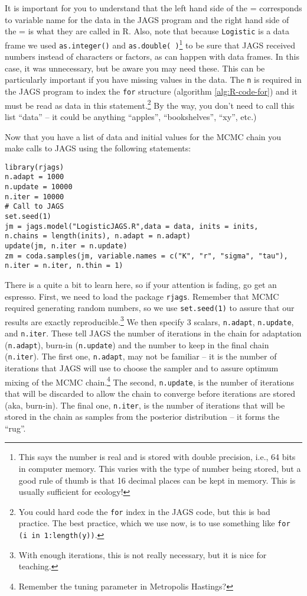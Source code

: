 \documentclass[12pt,english]{article}
\begin{document}
It is important for you to understand that the left hand side of the = corresponds to variable name for the data in the JAGS program and the right hand side of the = is what they are called in R. Also, note that because \texttt{Logistic} is a data frame we used \texttt{as.integer()} and \texttt{as.double( )}\footnote{This says the number is real and is stored with double precision, i.e., 64 bits in computer memory. This varies with the type of number being stored, but a good rule of thumb is that 16 decimal places can be kept in memory. This is usually sufficient for ecology!} to be sure that JAGS received numbers instead of characters or factors, as can happen with data frames. In this case, it was unnecessary, but be aware you may need these. This can be particularly important if you have missing values in the data. The \texttt{n} is required in the JAGS program to index the \texttt{for} structure (algorithm \ref{alg:R-code-for}) and it must be read as data in this statement.\footnote{You could hard code the \texttt{for} index in the JAGS code, but this is bad practice. The best practice, which we use now, is to use something like \texttt{for (i in 1:length(y))}.} By the way, you don't need to call this list \enquote{data} -- it could be anything \enquote{apples}, \enquote{bookshelves}, \enquote{xy}, etc.) 

Now that you have a list of data and initial values for the MCMC chain you make calls to JAGS using the following statements:

\begin{Verbatim}
library(rjags)
n.adapt = 1000
n.update = 10000
n.iter = 10000
# Call to JAGS
set.seed(1)
jm = jags.model("LogisticJAGS.R",data = data, inits = inits, 
n.chains = length(inits), n.adapt = n.adapt)
update(jm, n.iter = n.update)
zm = coda.samples(jm, variable.names = c("K", "r", "sigma", "tau"),
n.iter = n.iter, n.thin = 1)
\end{Verbatim}

\noindent There is a quite a bit to learn here, so if your attention is fading, go get an espresso. First, we need to load the package \texttt{rjags}. Remember that MCMC required generating random numbers, so we use \texttt{set.seed(1)} to assure that our results are exactly reproducible.\footnote{With enough iterations, this is not really necessary, but it is nice for teaching.} We then specify 3 scalars, \texttt{n.adapt},  \texttt{n.update}, and \texttt{n.iter}. These tell JAGS the number of iterations in the chain for adaptation (\texttt{n.adapt}), burn-in (\texttt{n.update}) and the number to keep in the final chain (\texttt{n.iter}). The first one, \texttt{n.adapt}, may not be familiar -- it is the number of iterations that JAGS will use to choose the sampler and to assure optimum mixing of the MCMC chain.\footnote{Remember the tuning parameter in Metropolis Hastings?} The second, \texttt{n.update}, is the number of iterations that will be discarded to allow the chain to converge before iterations are stored (aka, burn-in). The final one, \texttt{n.iter}, is the number of iterations that will be stored in the chain as samples from the posterior distribution -- it forms the \enquote{rug}.
\end{document}
